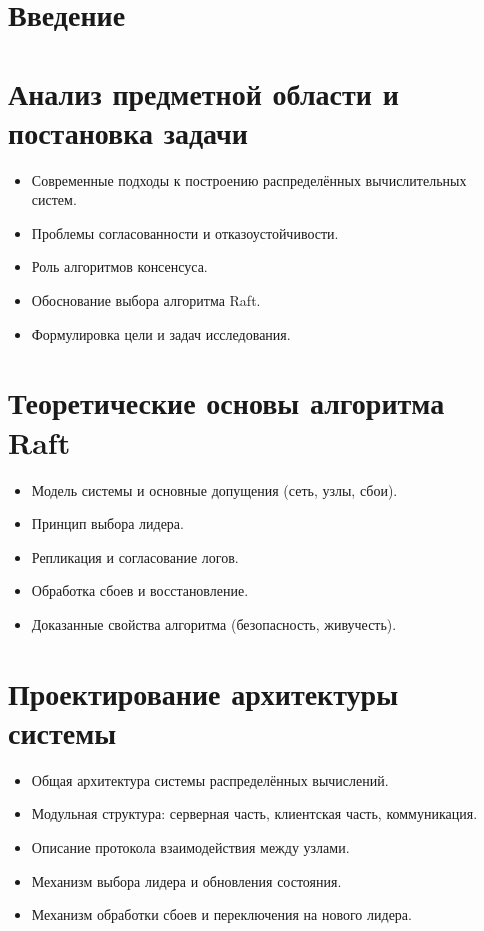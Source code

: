 \section*{Введение}

\section{Анализ предметной области и постановка задачи}
\begin{itemize}
    \item Современные подходы к построению распределённых вычислительных систем.
    \item Проблемы согласованности и отказоустойчивости.
    \item Роль алгоритмов консенсуса.
    \item Обоснование выбора алгоритма Raft.
    \item Формулировка цели и задач исследования.
\end{itemize}

\section{Теоретические основы алгоритма Raft}
\begin{itemize}
    \item Модель системы и основные допущения (сеть, узлы, сбои).
    \item Принцип выбора лидера.
    \item Репликация и согласование логов.
    \item Обработка сбоев и восстановление.
    \item Доказанные свойства алгоритма (безопасность, живучесть).
\end{itemize}

\section{Проектирование архитектуры системы}
\begin{itemize}
    \item Общая архитектура системы распределённых вычислений.
    \item Модульная структура: серверная часть, клиентская часть, коммуникация.
    \item Описание протокола взаимодействия между узлами.
    \item Механизм выбора лидера и обновления состояния.
    \item Механизм обработки сбоев и переключения на нового лидера.
\end{itemize}


